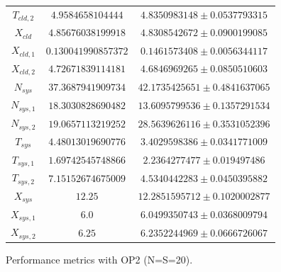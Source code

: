\begin{figure}
\begin{center}
\begin{tabular}{|c||c|c|}
$T_{cld,2}$  & $4.9584658104444$ & $4.8350983148\pm 0.0537793315$ \\ 
$X_{cld}$  & $4.85676038199918$ & $4.8308542672\pm 0.0900199085$ \\ 
$X_{cld,1}$  & $0.130041990857372$ & $0.1461573408\pm 0.0056344117$ \\ 
$X_{cld,2}$  & $4.72671839114181$ & $4.6846969265\pm 0.0850510603$ \\ 
\hline 
$N_{sys}$  & $37.3687941909734$ & $42.1735425651\pm 0.4841637065$ \\ 
$N_{sys,1}$  & $18.3030828690482$ & $13.6095799536\pm 0.1357291534$ \\ 
$N_{sys,2}$  & $19.0657113219252$ & $28.5639626116\pm 0.3531052396$ \\ 
$T_{sys}$  & $4.48013019690776$ & $3.4029598386\pm 0.0341771009$ \\ 
$T_{sys,1}$  & $1.69742545748866$ & $2.2364277477\pm 0.019497486$ \\ 
$T_{sys,2}$  & $7.15152674675009$ & $4.5340442283\pm 0.0450395882$ \\ 
$X_{sys}$  & $12.25$ & $12.2851595712\pm 0.1020002877$ \\ 
$X_{sys,1}$  & $6.0$ & $6.0499350743\pm 0.0368009794$ \\ 
$X_{sys,2}$  & $6.25$ & $6.2352244969\pm 0.0666726067$ \\ 
\hline
\hline
		\end{tabular}
	\end{center}
	\caption{Performance metrics with OP2 (N=S=20).}
	\label{tbl:evaluation-performance-metrics-2-20}
\end{figure}

